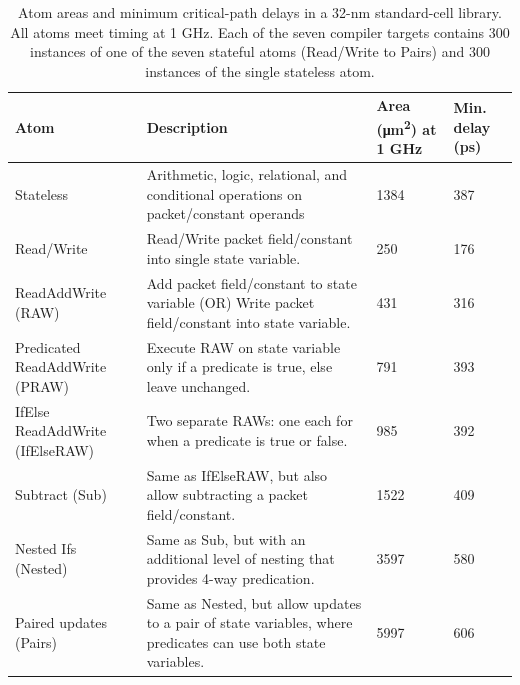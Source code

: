 \begin{table}[!t]
  \centering
  \begin{small}
  \begin{tabular}{|p{}|p{}|p{}|p{}|}
    \hline
    Atom & Description & Area (\si{\micro\metre\squared}) at 1 GHz & Min. delay (ps) \\
    \hline
    Stateless & Arithmetic, logic, relational, and conditional operations on packet/constant operands & 1384 & 387 \\
    \hline
    Read/Write & Read/Write packet field/constant into single state variable. & 250 & 176 \\
    \hline
    ReadAddWrite (RAW) & Add packet field/constant to state variable (OR) Write packet field/constant into state variable. & 431 & 316 \\
    \hline
    Predicated ReadAddWrite (PRAW) & Execute RAW on state variable only if a predicate is true, else leave unchanged. & 791 & 393 \\
    \hline
    IfElse ReadAddWrite (IfElseRAW) & Two separate RAWs: one each for when a predicate is true or false. & 985 & 392 \\
    \hline
    Subtract (Sub) & Same as IfElseRAW, but also allow subtracting a packet field/constant. & 1522 & 409 \\
    \hline
    Nested Ifs (Nested) & Same as Sub, but with an additional level of nesting that provides 4-way predication. & 3597 & 580 \\
    \hline
    Paired updates (Pairs) & Same as Nested, but allow updates to a pair of state variables, where predicates can use both state variables. & 5997 & 606 \\
    \hline
  \end{tabular}
  \end{small}
  \caption{Atom areas and minimum critical-path delays in a 32-nm
  standard-cell library.  All atoms meet timing at 1 GHz. Each of the seven
  compiler targets contains 300 instances of one of the seven stateful atoms (Read/Write to Pairs)
  and 300 instances of the single stateless atom.}
  \label{tab:templates}
\end{table}

